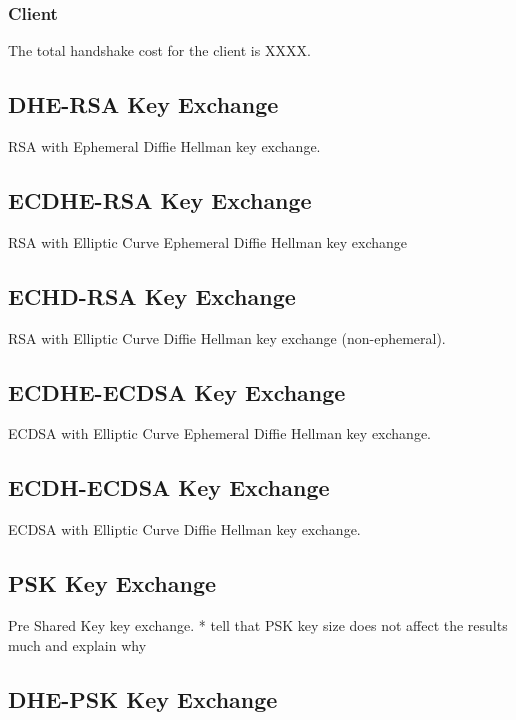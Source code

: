 \documentclass{llncs}
\begin{document}
\subsubsection{Client}

The total handshake cost for the client is XXXX.


\subsection{DHE-RSA Key Exchange}

RSA with Ephemeral Diffie Hellman key exchange.

\subsection{ECDHE-RSA Key Exchange}

RSA with Elliptic Curve Ephemeral Diffie Hellman key exchange

\subsection{ECHD-RSA Key Exchange}

RSA with Elliptic Curve Diffie Hellman key exchange (non-ephemeral).

\subsection{ECDHE-ECDSA Key Exchange}

ECDSA with Elliptic Curve Ephemeral Diffie Hellman key exchange.

\subsection{ECDH-ECDSA Key Exchange}

ECDSA with Elliptic Curve Diffie Hellman key exchange.

\subsection{PSK Key Exchange}

Pre Shared Key key exchange.
* tell that PSK key size does not affect the results much and explain why

\subsection{DHE-PSK Key Exchange}
\end{document}
